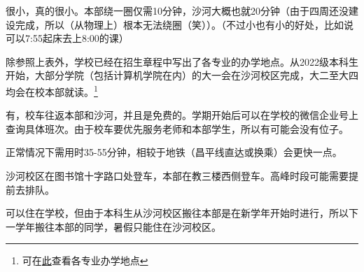 
很小，真的很小。本部绕一圈仅需10分钟，沙河大概也就20分钟（由于四周还没建设完成，所以（从物理上）根本无法绕圈（笑））。{\small （不过小也有小的好处，比如说可以7:55起床去上8:00的课）}


除参照上表外，学校已经在招生章程中写出了各专业的办学地点。从2022级本科生开始，大部分学院（包括计算机学院在内）的大一会在沙河校区完成，大二至大四均会在校本部就读。\footnote{可在\href{https://zsb.bupt.edu.cn/info/1005/1992.htm}{此}查看各专业办学地点}


有，校车往返本部和沙河，并且是免费的。学期开始后可以在学校的微信企业号上查询具体班次。由于校车要优先服务老师和本部学生，所以有可能会没有位子。

正常情况下需用时35-55分钟，相较于地铁（昌平线直达或换乘）会更快一点。

沙河校区在图书馆十字路口处登车，本部在教三楼西侧登车。高峰时段可能需要提前去排队。


可以住在学校，但由于本科生从沙河校区搬往本部是在新学年开始时进行，所以下一学年搬往本部的同学，暑假只能住在沙河校区。